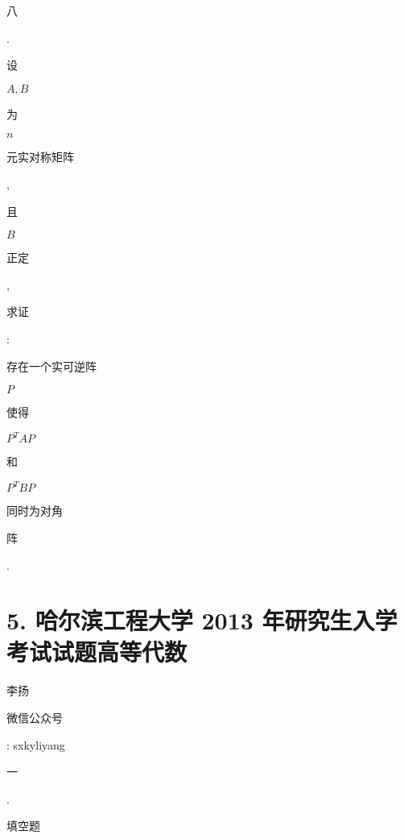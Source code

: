 \documentclass[10pt]{article}
\begin{document}
\begin{CJK}{UTF8}{mj}八\end{CJK}. \begin{CJK}{UTF8}{mj}设\end{CJK} $A, B$ \begin{CJK}{UTF8}{mj}为\end{CJK} $n$ \begin{CJK}{UTF8}{mj}元实对称矩阵\end{CJK}, \begin{CJK}{UTF8}{mj}且\end{CJK} $B$ \begin{CJK}{UTF8}{mj}正定\end{CJK}, \begin{CJK}{UTF8}{mj}求证\end{CJK}: \begin{CJK}{UTF8}{mj}存在一个实可逆阵\end{CJK} $P$ \begin{CJK}{UTF8}{mj}使得\end{CJK} $P^{T} A P$ \begin{CJK}{UTF8}{mj}和\end{CJK} $P^{T} B P$ \begin{CJK}{UTF8}{mj}同时为对角\end{CJK} \begin{CJK}{UTF8}{mj}阵\end{CJK}.

\section{5. 哈尔滨工程大学 2013 年研究生入学考试试题高等代数}
\begin{CJK}{UTF8}{mj}李扬\end{CJK}

\begin{CJK}{UTF8}{mj}微信公众号\end{CJK}: sxkyliyang

\begin{CJK}{UTF8}{mj}一\end{CJK}. \begin{CJK}{UTF8}{mj}填空题\end{CJK}
\end{document}

